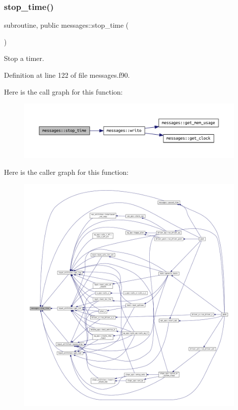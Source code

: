 \subsubsection{\texorpdfstring{stop\+\_\+time()}{stop\_time()}}
{\footnotesize\ttfamily subroutine, public messages\+::stop\+\_\+time (\begin{DoxyParamCaption}{ }\end{DoxyParamCaption})}



Stop a timer. 



Definition at line 122 of file messages.\+f90.

Here is the call graph for this function\+:
\nopagebreak
\begin{figure}[H]
\begin{center}
\leavevmode
\includegraphics[width=350pt]{namespacemessages_aed343894ae4a28ad6dfbd1d39aac64ff_cgraph}
\end{center}
\end{figure}
Here is the caller graph for this function\+:
\nopagebreak
\begin{figure}[H]
\begin{center}
\leavevmode
\includegraphics[width=350pt]{namespacemessages_aed343894ae4a28ad6dfbd1d39aac64ff_icgraph}
\end{center}
\end{figure}
\mbox{\label{namespacemessages_aa4a8d01563e92558e8a0875b075ec54c}} 
